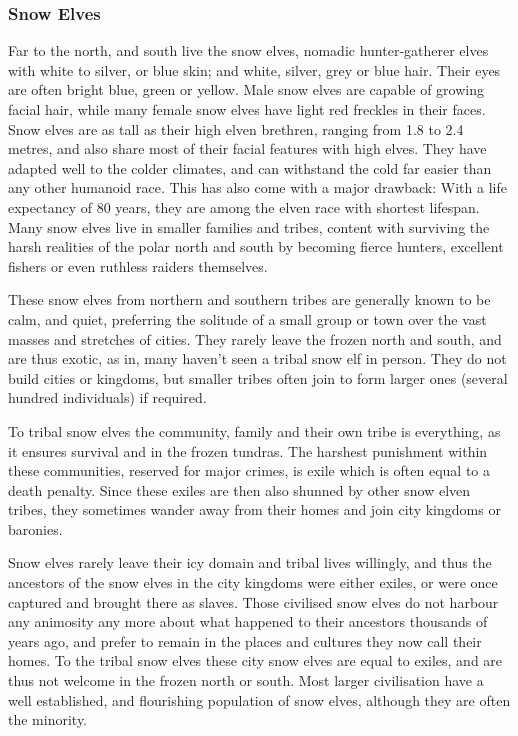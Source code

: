 \subsubsection{Snow Elves}
\label{sec:Snow Elves}


Far to the north, and south live the snow elves, nomadic hunter-gatherer elves
with white to silver, or blue skin; and white, silver, grey or blue
hair. Their eyes are often bright blue, green or yellow. Male snow elves are
capable of growing facial hair, while many female snow elves have light red
freckles in their faces. Snow elves are as tall as their high elven brethren,
ranging from 1.8 to 2.4 metres, and also share most of their facial features
with high elves. They have adapted well to the colder climates, and can
withstand the cold far easier than any other humanoid race. This has also come
with a major drawback: With a life expectancy of 80 years, they are among the
elven race with shortest lifespan. Many snow elves live in smaller families
and tribes, content with surviving the harsh realities of the polar north and
south by becoming fierce hunters, excellent fishers or even ruthless raiders
themselves.

These snow elves from northern and southern tribes are generally known to be
calm, and quiet, preferring the solitude of a small group or town over the
vast masses and stretches of cities. They rarely leave the frozen north and
south, and are thus exotic, as in, many haven't seen a tribal snow elf in
person. They do not build cities or kingdoms, but smaller tribes often join to
form larger ones (several hundred individuals) if required.

To tribal snow elves the community, family and their own tribe is everything, as
it ensures survival and in the frozen tundras. The harshest punishment within
these communities, reserved for major crimes, is exile which is often equal to
a death penalty. Since these exiles are then also shunned by other snow elven
tribes, they sometimes wander away from their homes and join city kingdoms or
baronies.

Snow elves rarely leave their icy domain and tribal lives willingly, and thus
the ancestors of the snow elves in the city kingdoms were either exiles, or
were once captured and brought there as slaves. Those civilised snow elves do
not harbour any animosity any more about what happened to their ancestors
thousands of years ago, and prefer to remain in the places and cultures they
now call their homes. To the tribal snow elves these city snow elves are equal
to exiles, and are thus not welcome in the frozen north or south. Most larger
civilisation have a well established, and flourishing population of snow elves,
although they are often the minority.

